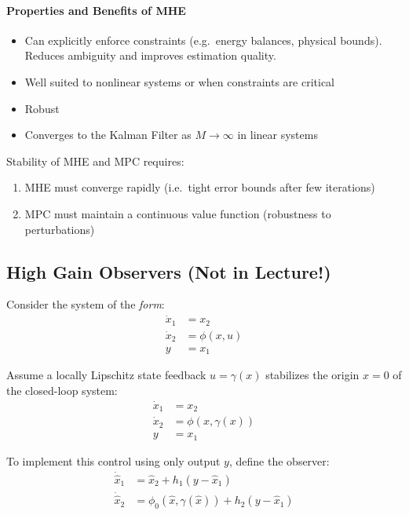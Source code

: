 \paragraph{Properties and Benefits of MHE}

\begin{itemize}
    \item [+] Can explicitly enforce constraints (e.g.\ energy balances, physical bounds). Reduces ambiguity and improves estimation quality.
    \item [+] Well suited to nonlinear systems or when constraints are critical
    \item [+] Robust
    \item Converges to the Kalman Filter as $M \to \infty$ in linear systems
\end{itemize}

\newpar{}

Stability of MHE and MPC requires:
\begin{enumerate}
    \item MHE must converge rapidly (i.e.\ tight error bounds after few iterations)
    \item MPC must maintain a continuous value function (robustness to perturbations)
\end{enumerate}

\subsection{High Gain Observers (Not in Lecture!)}


Consider the system of the \textit{form}:
\begin{align*}
    \dot{x}_1 & = x_2        \\
    \dot{x}_2 & = \phi(x, u) \\
    y         & = x_1
\end{align*}

Assume a locally Lipschitz state feedback $u = \gamma(x)$ stabilizes the origin $x = 0$ of the closed-loop system:
\begin{align*}
    \dot{x}_1 & = x_2                \\
    \dot{x}_2 & = \phi(x, \gamma(x)) \\
    y         & = x_1
\end{align*}
\newpar{}

To implement this control using only output $y$, define the observer:
\begin{align*}
    \dot{\hat{x}}_1 & = \hat{x}_2 + h_1(y - \hat{x}_1)                        \\
    \dot{\hat{x}}_2 & = \phi_0(\hat{x}, \gamma(\hat{x})) + h_2(y - \hat{x}_1)
\end{align*}

